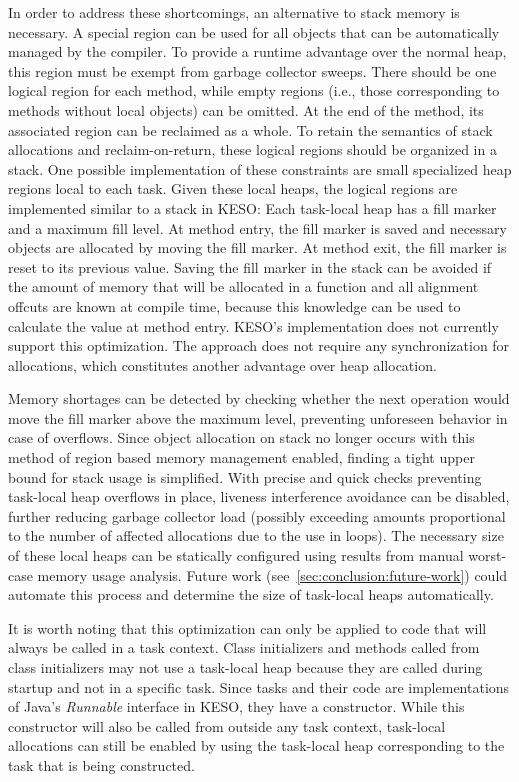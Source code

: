 			In order to address these shortcomings, an alternative to stack memory is necessary. A special region can be used
			for all objects that can be automatically managed by the compiler. To provide a runtime advantage over the normal
			heap, this region must be exempt from garbage collector sweeps. There should be one logical region for each
			method, while empty regions (i.e., those corresponding to methods without local objects) can be omitted. At the
			end of the method, its associated region can be reclaimed as a whole. To retain the semantics of stack allocations
			and reclaim-on-return, these logical regions should be organized in a stack. One possible implementation of these
			constraints are small specialized heap regions local to each task. Given these local heaps, the logical regions
			are implemented similar to a stack in KESO: Each task-local heap has a fill marker and a maximum fill level. At
			method entry, the fill marker is saved and necessary objects are allocated by moving the fill marker. At method
			exit, the fill marker is reset to its previous value. Saving the fill marker in the stack can be avoided if the
			amount of memory that will be allocated in a function and all alignment offcuts are known at compile time, because
			this knowledge can be used to calculate the value at method entry. KESO's implementation does not currently
			support this optimization. The approach does not require any synchronization for allocations, which constitutes
			another advantage over heap allocation.

			Memory shortages can be detected by checking whether the next operation would move the fill marker above the
			maximum level, preventing unforeseen behavior in case of overflows. Since object allocation on stack no longer
			occurs with this method of region based memory management enabled, finding a tight upper bound for stack usage is
			simplified. With precise and quick checks preventing task-local heap overflows in place, liveness interference
			avoidance can be disabled, further reducing garbage collector load (possibly exceeding amounts proportional to the
			number of affected allocations due to the use in loops). The necessary size of these local heaps can be statically
			configured using results from manual worst-case memory usage analysis. Future work
			(see~\cref{sec:conclusion:future-work}) could automate this process and determine the size of task-local heaps
			automatically.

			It is worth noting that this optimization can only be applied to code that will always be called in a task
			context. Class initializers and methods called from class initializers may not use a task-local heap because they
			are called during startup and not in a specific task. Since tasks and their code are implementations of Java's
			\emph{Runnable} interface in KESO, they have a constructor. While this constructor will also be called from
			outside any task context, task-local allocations can still be enabled by using the task-local heap corresponding
			to the task that is being constructed.

